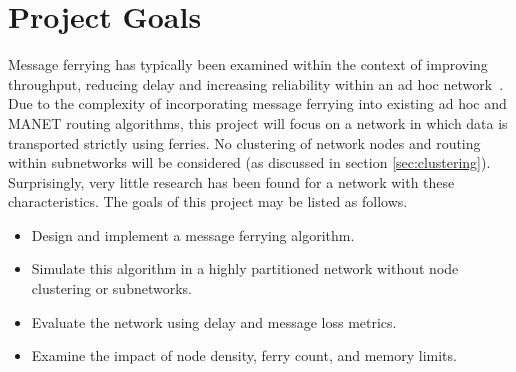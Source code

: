 
\section{Project Goals}

Message ferrying has typically been examined within the context of improving throughput, reducing delay and increasing reliability within an ad hoc network~\cite{efficientrouting}.
Due to the complexity of incorporating message ferrying into existing ad hoc and MANET routing algorithms, this project will focus on a network in which data is transported strictly using ferries.
No clustering of network nodes and routing within subnetworks will be considered (as discussed in section \ref{sec:clustering}).
Surprisingly, very little research has been found for a network with these characteristics.
The goals of this project may be listed as follows.

\begin{itemize}
\item Design and implement a message ferrying algorithm.
\item Simulate this algorithm in a highly partitioned network without node clustering or subnetworks.
\item Evaluate the network using delay and message loss metrics.
\item Examine the impact of node density, ferry count, and memory limits.
\end{itemize}


%
%
